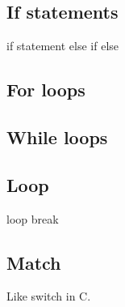 
\subsection{If statements}

if statement {} else if {} else {}

\subsection{For loops}

\subsection{While loops}

\subsection{Loop}

loop
break


\subsection{Match}
Like switch in C.
